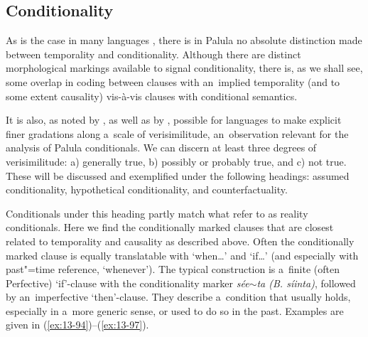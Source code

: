 \subsection{Conditionality}
\label{subsec:13-4-4}

As is the case in many languages \citep[193]{thompsonlongacre1985}, there is in Palula no absolute distinction made between temporality and conditionality. Although there are distinct morphological markings available to signal conditionality, there is, as we shall see, some overlap in coding between clauses with an~implied temporality (and to some extent causality) vis-à-vis clauses with conditional semantics.



It is also, as noted by \citet[190--191]{thompsonlongacre1985}, as well as by \citet[333--334]{givon2001b}, possible for languages to make explicit finer gradations along a~scale of verisimilitude, an~observation relevant for the analysis of Palula conditionals. We can discern at least three degrees of verisimilitude: a) generally true, b) possibly or probably true, and c) not true. These will be discussed and exemplified under the following headings: assumed conditionality, hypothetical conditionality, and counterfactuality.



 Conditionals under this heading partly match what \citet[190--191]{thompsonlongacre1985} refer to as reality conditionals. Here we find the conditionally marked clauses that are closest related to temporality and causality as described above. Often the conditionally marked clause is equally translatable with `when{\ldots}' and `if{\ldots}' (and especially with past"=time reference, `whenever'). The typical construction is a~finite (often Perfective) `if'-clause with the conditionality marker \textit{sée$\sim$ta (B. síinta)}, followed by an~imperfective `then'-clause. They describe a~condition that usually holds, especially in a~more generic sense, or used to do so in the past. Examples are given in (\ref{ex:13-94})--(\ref{ex:13-97}).

